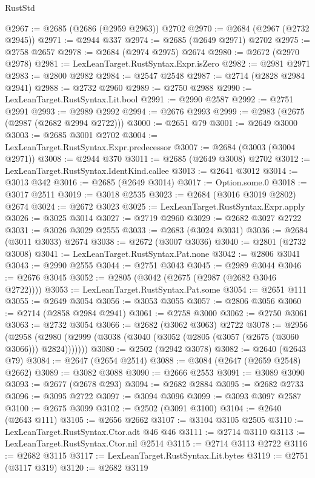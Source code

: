 \begin{lexlean}{RustStd}
\begin{coremodule}
{\begin{coremodule}
{{{{{{{{{{{{{{{{{{{{{{{{{{@2967 := @2685 (@2686 (@2959 @2963)) @2702
@2970 := @2684 (@2967 (@2732 @2945))
@2971 := @2944 @337
@2974 := @2685 (@2649 @2971) @2702
@2975 := @2758 @2657
@2978 := @2684 (@2974 @2975) @2674
@2980 := @2672 (@2970 @2978)
@2981 := LexLeanTarget.RustSyntax.Expr.isZero
@2982 := @2981 @2971
@2983 := @2800 @2982
@2984 := @2547 @2548
@2987 := @2714 (@2828 @2984 @2941)
@2988 := @2732 @2960
@2989 := @2750 @2988
@2990 := LexLeanTarget.RustSyntax.Lit.bool
@2991 := @2990 @2587
@2992 := @2751 @2991
@2993 := @2989 @2992
@2994 := @2676 @2993
@2999 := @2983 (@2675 (@2987 (@2682 @2994 @2722)))
@3000 := @2651 @79
@3001 := @2649 @3000
@3003 := @2685 @3001 @2702
@3004 := LexLeanTarget.RustSyntax.Expr.predecessor
@3007 := @2684 (@3003 (@3004 @2971))
@3008 := @2944 @370
@3011 := @2685 (@2649 @3008) @2702
@3012 := LexLeanTarget.RustSyntax.IdentKind.callee
@3013 := @2641 @3012
@3014 := @3013 @342
@3016 := @2685 (@2649 @3014)
@3017 := Option.some.{0}
@3018 := @3017 @2511
@3019 := @3018 @2535
@3023 := @2684 (@3016 @3019 @2802) @2674
@3024 := @2672 @3023
@3025 := LexLeanTarget.RustSyntax.Expr.apply
@3026 := @3025 @3014
@3027 := @2719 @2960
@3029 := @2682 @3027 @2722
@3031 := @3026 @3029 @2555
@3033 := @2683 (@3024 @3031)
@3036 := @2684 (@3011 @3033) @2674
@3038 := @2672 (@3007 @3036)
@3040 := @2801 (@2732 @3008)
@3041 := LexLeanTarget.RustSyntax.Pat.none
@3042 := @2806 @3041
@3043 := @2990 @2555
@3044 := @2751 @3043
@3045 := @2989 @3044
@3046 := @2676 @3045
@3052 := @2805 (@3042 (@2675 (@2987 (@2682 @3046 @2722))))
@3053 := LexLeanTarget.RustSyntax.Pat.some
@3054 := @2651 @111
@3055 := @2649 @3054
@3056 := @3053 @3055
@3057 := @2806 @3056
@3060 := @2714 (@2858 @2984 @2941)
@3061 := @2758 @3000
@3062 := @2750 @3061
@3063 := @2732 @3054
@3066 := @2682 (@3062 @3063) @2722
@3078 := @2956
    (@2958 (@2980 (@2999 (@3038 (@3040 (@3052 (@2805 (@3057 (@2675 (@3060 @3066))) @2824)))))))
@3080 := @2502 (@2942 @3078)
@3082 := @2640 (@2643 @79)
@3084 := @2647 (@2654 @2514)
@3088 := @3084 (@2647 (@2659 @2548) @2662)
@3089 := @3082 @3088
@3090 := @2666 @2553
@3091 := @3089 @3090
@3093 := @2677 (@2678 @293)
@3094 := @2682 @2884
@3095 := @2682 @2733
@3096 := @3095 @2722
@3097 := @3094 @3096
@3099 := @3093 @3097 @2587
@3100 := @2675 @3099
@3102 := @2502 (@3091 @3100)
@3104 := @2640 (@2643 @111)
@3105 := @2656 @2662
@3107 := @3104 @3105 @2505
@3110 := LexLeanTarget.RustSyntax.Ctor.adt @46 @46
@3111 := @2714 @3110
@3113 := LexLeanTarget.RustSyntax.Ctor.nil @2514
@3115 := @2714 @3113 @2722
@3116 := @2682 @3115
@3117 := LexLeanTarget.RustSyntax.Lit.bytes
@3119 := @2751 (@3117 @319)
@3120 := @2682 @3119
}}}}}}}}}}}}}}}}}}}}}}}}}}
\end{coremodule}}
\end{coremodule}
\end{lexlean}
